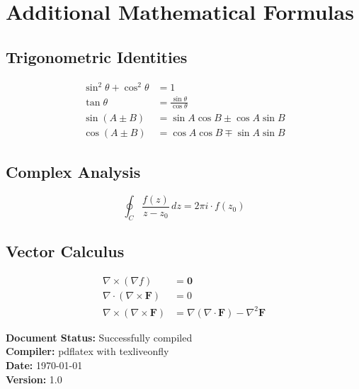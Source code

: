 \documentclass[11pt,a4paper]{article}
\theoremstyle{definition}
\begin{document}
\appendix

\section{Additional Mathematical Formulas}

\subsection{Trigonometric Identities}

\begin{align}
    \sin^2\theta + \cos^2\theta &= 1 \\
    \tan\theta &= \frac{\sin\theta}{\cos\theta} \\
    \sin(A \pm B) &= \sin A \cos B \pm \cos A \sin B \\
    \cos(A \pm B) &= \cos A \cos B \mp \sin A \sin B
\end{align}

\subsection{Complex Analysis}

\begin{equation}
    \oint_C \frac{f(z)}{z-z_0}\,dz = 2\pi i \cdot f(z_0)
\end{equation}

\subsection{Vector Calculus}

\begin{align}
    \nabla \times (\nabla f) &= \mathbf{0} \\
    \nabla \cdot (\nabla \times \mathbf{F}) &= 0 \\
    \nabla \times (\nabla \times \mathbf{F}) &= \nabla(\nabla \cdot \mathbf{F}) - \nabla^2\mathbf{F}
\end{align}

\vspace{2cm}

\noindent\textbf{Document Status:} Successfully compiled \\
\textbf{Compiler:} pdflatex with texliveonfly \\
\textbf{Date:} \today \\
\textbf{Version:} 1.0
\end{document}

